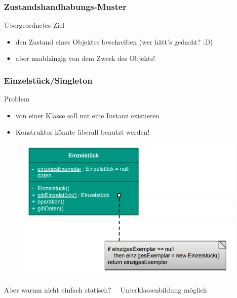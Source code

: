 \documentclass[18pt]{beamer}
\begin{document}
	\begin{frame}
		\frametitle{Zustandshandhabungs-Muster}
		\begin{block}{Übergeordnetes Ziel}
			\begin{itemize}
				\item den Zustand eines Objektes beschreiben (wer hätt's gedacht? :D) \pause 
				\item aber unabhängig von dem Zweck des Objekts!
			\end{itemize}
		\end{block}
	\end{frame}

	\begin{frame}
		\frametitle{Einzelstück/Singleton}
		\begin{block}{Problem}
			\begin{itemize}
				\item von einer Klasse soll nur eine Instanz existieren
				\item Konstruktor könnte überall benutzt werden!
			\end{itemize}
		\end{block}
		\pause
		\centering
		\begin{figure}
			\includegraphics[scale=0.3]{./pics/tut4/singleton.png}
		\end{figure}
		\pause
		Aber warum nicht einfach statisch?\pause ~~ Unterklassenbildung möglich
	\end{frame}
\end{document}
